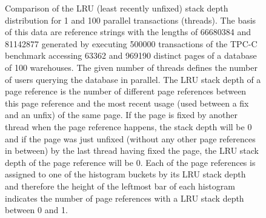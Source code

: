 \begin{@empty}
\begin{figure}[ht!]
        \caption[Comparison of LRU stack depth distribution for 1 and 100 threads]{Comparison of the LRU (least recently unfixed) stack depth distribution for 1 and 100 parallel transactions (threads). The basis of this data are reference strings with the lengths of \num{66680384} and \num{81142877} generated by executing \num{500000} transactions of the TPC-C benchmark accessing \num{63362} and \num{969190} distinct pages of a database of 100 warehouses. The given number of threads defines the number of users querying the database in parallel. The LRU stack depth of a page reference is the number of different page references between this page reference and the most recent usage (used between a fix and an unfix) of the same page. If the page is fixed by another thread when the page reference happens, the stack depth will be 0 and if the page was just unfixed (without any other page references in between) by the last thread having fixed the page, the LRU stack depth of the page reference will be 0. Each of the page references is assigned to one of the histogram buckets by its LRU stack depth and therefore the height of the leftmost bar of each histogram indicates the number of page references with a LRU stack depth between 0 and 1.}
        \label{fig:locality}
    \end{figure}
\end{@empty}

